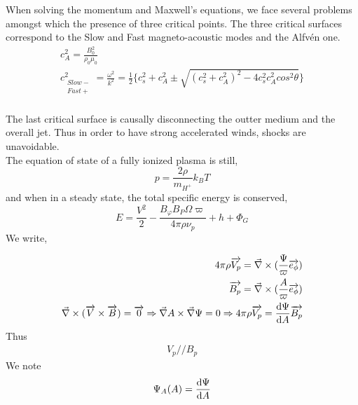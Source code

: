 \documentclass[10pt,a4paper,english]{article}
\begin{document}
When solving the momentum and Maxwell's equations, we face several problems amongst which the presence of three critical points. The three critical surfaces correspond to the Slow and Fast magneto-acoustic modes and the Alfvén one.
\begin{align}
   c^{2}_{A} = \frac{B^{2}_{0}}{\rho_{0}\mu_{0}} \\
  c^{2}_{\substack{Slow- \\Fast+}} = \frac{\omega^{2}}{k^{2}}= \frac{1}{2}\lbrace c^{2}_{s} + c^{2}_{A} \pm \sqrt{(c^{2}_{s}+c^{2}_{A})^{2} - 4c^{2}_{s}c^{2}_{A}cos^{2}\theta}\rbrace \\
\end{align}

The last critical surface is causally disconnecting the outter medium and the overall jet. Thus in order to have strong accelerated winds, shocks are unavoidable.
\\
The equation of state of a fully ionized plasma is still,
\begin{equation}
   p = \frac{2\rho}{m_{H^{+}}} k_{B}T
\end{equation}
and when in a steady state, the total specific energy is conserved,
\begin{equation}
   E = \frac{V^{2}}{2}-\frac{B_{\varphi}B_{P}\Omega\varpi}{4\pi\rho\nu_{p}}+h+\Phi_{G}
\end{equation}
We write,

\begin{align}
   4\pi\rho\overrightarrow{V_{p}} = \vec\nabla \times (\frac{\Psi}{\varpi}\overrightarrow{e_{\phi}}) \\
  \overrightarrow{B_{p}} = \vec\nabla \times (\frac{A}{\varpi}\overrightarrow{e_{\phi}}) \\
  \vec \nabla \times (\overrightarrow{V} \times \overrightarrow{B}) = \overrightarrow{0} \Rightarrow \vec \nabla A \times \vec \nabla \Psi = 0 \Rightarrow 4\pi\rho\overrightarrow{V_{p}} = \frac{\mathrm{d}{\Psi}}{\mathrm{d}{A}}\overrightarrow{B_{p}}
\end{align}
Thus
\begin{align*}
   V_{p} // B_{p}
\end{align*}
We note
\begin{align*}
  \Psi_{A}(A) = \frac{\mathrm{d}{\Psi}}{\mathrm{d}{A}}
\end{align*}
\end{document}
